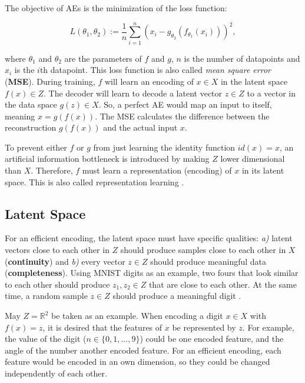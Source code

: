 \documentclass[a4paper]{IEEEtran}
\begin{document}
The objective of AEs is the minimization of the loss function:

\begin{equation}
	L(\theta_1, \theta_2) := \frac{1}{n} \sum_{i = 1}^{n}{(x_i - g_{\theta_2}(f_{\theta_1}(x_i)))^2},
	\label{mse}
\end{equation}

where $\theta_1$ and $\theta_2$ are the parameters of $f$ and $g$, $n$ is the number of datapoints and $x_i$ is the $i$th datapoint. This loss function is also called \textit{mean square error} (\textbf{MSE}). During training, $f$ will learn an encoding of $x \in X$ in the latent space $f(x) \in Z$. The decoder will learn to decode a latent vector $z \in Z$ to a vector in the data space $g(z) \in X$. So, a perfect AE would map an input to itself, meaning $x = g(f(x))$. The MSE calculates the difference between the reconstruction $g(f(x))$ and the actual input $x$.

To prevent either $f$ or $g$ from just learning the identity function $id(x) = x$, an artificial information bottleneck is introduced by making $Z$ lower dimensional than $X$. Therefore, $f$ must learn a representation (encoding) of $x$ in its latent space. This is also called representation learning \cite{DBLP:journals/corr/abs-1206-5538}. 

\subsection{Latent Space}
For an efficient encoding, the latent space must have specific qualities: \textit{a)} latent vectors close to each other in $Z$ should produce samples close to each other in $X$ (\textbf{continuity}) and \textit{b)} every vector $z \in Z$ should produce meaningful data (\textbf{completeness}). Using MNIST digits as an example, two fours that look similar to each other should produce $z_1, z_2 \in Z$ that are close to each other. At the same time, a random sample $z \in Z$ should produce a meaningful digit \cite{burgess2018understanding}.

May $Z = \mathbb{R}^{2}$ be taken as an example. When encoding a digit $x \in X$ with $f(x) = z$, it is desired that the features of $x$ be represented by $z$. For example, the value of the digit ($n \in \{0,1,...,9\}$) could be one encoded feature, and the angle of the number another encoded feature. For an efficient encoding, each feature would be encoded in an own dimension, so they could be changed independently of each other.
\end{document}
